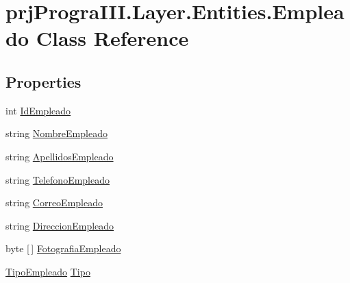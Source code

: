 \hypertarget{classprj_progra_i_i_i_1_1_layer_1_1_entities_1_1_empleado}{}\section{prj\+Progra\+I\+I\+I.\+Layer.\+Entities.\+Empleado Class Reference}
\label{classprj_progra_i_i_i_1_1_layer_1_1_entities_1_1_empleado}
\subsection*{Properties}
\begin{DoxyCompactItemize}
\item 
int \hyperlink{classprj_progra_i_i_i_1_1_layer_1_1_entities_1_1_empleado_a4559b68a53f418ad08644da74945715d}{Id\+Empleado}
\item 
string \hyperlink{classprj_progra_i_i_i_1_1_layer_1_1_entities_1_1_empleado_a1e1785328a4e1f2d63d61c44e9fc0866}{Nombre\+Empleado}
\item 
string \hyperlink{classprj_progra_i_i_i_1_1_layer_1_1_entities_1_1_empleado_a329a9f47ed75d4908c65d10bfac0da11}{Apellidos\+Empleado}
\item 
string \hyperlink{classprj_progra_i_i_i_1_1_layer_1_1_entities_1_1_empleado_a50c4e6598f83c7695206c753bbc761b4}{Telefono\+Empleado}
\item 
string \hyperlink{classprj_progra_i_i_i_1_1_layer_1_1_entities_1_1_empleado_a6e2504f985ee7d23b50503022b28c4c5}{Correo\+Empleado}
\item 
string \hyperlink{classprj_progra_i_i_i_1_1_layer_1_1_entities_1_1_empleado_afe3f142de56dac659474bb71a94c48c6}{Direccion\+Empleado}
\item 
byte \mbox{[}$\,$\mbox{]} \hyperlink{classprj_progra_i_i_i_1_1_layer_1_1_entities_1_1_empleado_aac3877f0c8bd1c0e09a9fd3b2a142800}{Fotografia\+Empleado}
\item 
\hyperlink{_tipo_empleado_8cs_a13ab6a6d206b912e5c08708cdf950169}{Tipo\+Empleado} \hyperlink{classprj_progra_i_i_i_1_1_layer_1_1_entities_1_1_empleado_a3554c50c15132769e530ebe4ee42a2ac}{Tipo}
\end{DoxyCompactItemize}


